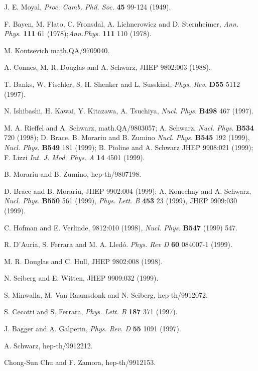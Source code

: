 \documentclass[a4paper,12pt]{article}
\begin{document}
\begin{thebibliography}{100}

   J. E. Moyal, {\it Proc. Camb. Phil. Soc.} {\bf 45} 99-124
(1949).

 F. Bayen, M. Flato, C. Fronsdal, A. Lichnerowicz and  D.
Sternheimer, {\it  Ann. Phys.} {\bf 111} 61 (1978);{\it  Ann.Phys.} {\bf
111}
 110 (1978).

  M. Kontsevich math.QA/9709040.

 A. Connes, M. R. Douglas and A. Schwarz,   JHEP 9802:003
(1988).

 T. Banks, W. Fischler, S. H. Shenker and L. Susskind, {\it
Phys. Rev.}
{\bf D55} 5112 (1997).

 N. Ishibashi, H. Kawai, Y. Kitazawa, A. Tsuchiya, {\it
Nucl. Phys.} 
{\bf B498} 467 (1997).


 M. A. Rieffel and A. Schwarz, math.QA/9803057; A. Schwarz,
{\it Nucl. Phys.} 
{\bf B534} 720 (1998); D. Brace, B. Morariu and B. Zumino {\it Nucl.
Phys.} {\bf
 B545} 192 (1999), {\it Nucl. Phys.} {\bf
 B549} 181 (1999); B. Pioline and A. Schwarz JHEP 9908:021 (1999); F.
Lizzi
{\it Int. J. Mod. Phys. A } {\bf 14} 4501 (1999).  


 B. Morariu and B. Zumino, hep-th/9807198.

 D. Brace and B. Morariu,  JHEP 9902:004 (1999); A. Konechny
and A. Schwarz,
{\it Nucl. Phys.} {\bf B550} 561 (1999), 
{\it Phys. Lett. B} {\bf 453} 23  (1999), JHEP 9909:030 (1999).


 C. Hofman and E. Verlinde,  9812:010 (1998), {\it Nucl.
Phys.} {\bf B547}
(1999) 547.

 R. D'Auria, S. Ferrara and M. A. Lled\'o. {\it Phys. Rev D}
{\bf 60 } 084007-1  (1999).

 M. R. Douglas and C. Hull, JHEP 9802:008 (1998). 

 N. Seiberg and E. Witten,  JHEP 9909:032 (1999).

 S. Minwalla, M. Van Raamsdonk and N. Seiberg,
hep-th/9912072.

 S. Cecotti and S. Ferrara, {\it Phys. Lett. B} {\bf 187} 371
(1997).

 J. Bagger and A. Galperin, {\it Phys. Rev. D} {\bf 55} 1091
(1997).

 A. Schwarz, hep-th/9912212.

 Chong-Sun Chu and F. Zamora, hep-th/9912153.


\end{thebibliography}
\end{document}
